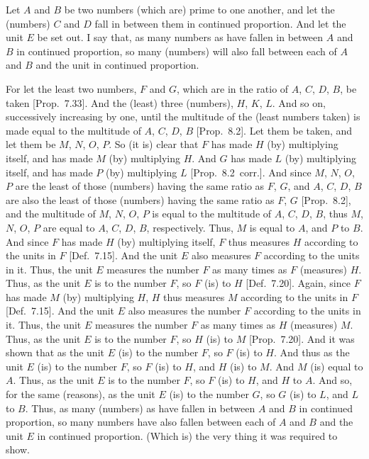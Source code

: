 \begin{Parallel}{}{}
{\epsfysize=2in
\centerline{}

Let $A$ and $B$ be two numbers (which are) prime to one another, and let the
(numbers) $C$ and $D$ fall in  between them in continued proportion. And let the unit $E$ be set out. I say that, as many numbers   as have fallen in between $A$ and $B$ in continued proportion, so many (numbers)  will also
fall between each of $A$ and $B$ and the unit in continued proportion.

For let the least two numbers, $F$ and $G$, which are in the
ratio of $A$, $C$, $D$, $B$, be taken [Prop.~7.33]. And the (least) three (numbers), $H$, $K$, $L$. And so on, successively increasing by one, until the multitude
of the (least numbers taken) is made  equal to the multitude of $A$, $C$, $D$, $B$
[Prop.~8.2]. Let them be taken, and let
them be $M$, $N$, $O$, $P$. So (it is) clear that $F$ has made $H$ (by)
multiplying itself, and has made $M$ (by) multiplying $H$. And $G$
has made $L$ (by) multiplying itself, and has made $P$ (by) multiplying $L$
[Prop.~8.2~corr.]. And since $M$, $N$, $O$, $P$
are the least of those (numbers) having the same ratio as $F$, $G$, and
$A$, $C$, $D$, $B$ are also the least of those (numbers) having the
same ratio as $F$, $G$ [Prop.~8.2], and the multitude
of $M$, $N$, $O$, $P$ is equal to the multitude of $A$, $C$, $D$, $B$, thus
$M$, $N$, $O$, $P$ are  equal to  $A$, $C$, $D$, $B$, respectively. 
Thus, $M$ is equal to $A$, and $P$ to $B$. And since $F$ has made
$H$ (by) multiplying itself, $F$ thus measures $H$ according to the
units in $F$ [Def.~7.15].  And the unit $E$ also
measures $F$ according to the units in it. Thus, the unit $E$
measures the number $F$ as many times as $F$ (measures) $H$. Thus,
as the unit $E$ is to the number $F$, so $F$ (is) to $H$ [Def.~7.20]. Again, since $F$ has made $M$ (by)
multiplying $H$, $H$ thus measures $M$ according to the units in $F$
 [Def.~7.15].  And the unit $E$ also measures
 the number $F$ according to the units in it. Thus, the unit $E$ measures
 the number $F$ as many times as $H$ (measures) $M$. Thus,
 as the unit $E$ is to the number $F$, so $H$ (is) to $M$ [Prop.~7.20]. And it was shown
 that as the unit $E$ (is) to the number $F$, so $F$ (is) to $H$. And thus
 as the unit $E$ (is) to the number $F$, so $F$ (is) to $H$, and $H$ (is)
 to $M$. And $M$ (is) equal to $A$. Thus, as the unit $E$ is to the number
 $F$, so $F$ (is) to $H$, and $H$ to $A$. And so, for the same (reasons),
 as the unit $E$ (is) to the number $G$, so $G$ (is) to $L$, and $L$ to
 $B$.  Thus, as many  (numbers)  as have fallen
 in between $A$ and $B$  in continued proportion,  so many numbers  have also fallen between each of $A$ and $B$ and the unit 
 $E$ in continued proportion. (Which is) the very thing it was required to show. }
\end{Parallel}

